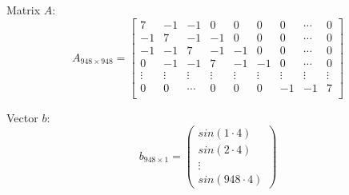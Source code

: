 \documentclass{article}
\begin{document}
Matrix $A$:
\[
A_{948 \times 948} = \begin{bmatrix}
    7 & -1 & -1 & 0 & 0 & 0 & 0 & \cdots & 0 \\
    -1 & 7 & -1 & -1 & 0 & 0 & 0 & \cdots & 0 \\
    -1 & -1 & 7 & -1 & -1 & 0 & 0 & \cdots & 0 \\
    0 & -1 & -1 & 7 & -1 & -1 & 0 & \cdots & 0 \\
    \vdots & \vdots & \vdots & \vdots & \vdots & \vdots & \vdots & \vdots & \vdots \\
    0 & 0 & \cdots & 0 & 0 & 0 & -1 & -1 & 7 \\

\end{bmatrix}
\]

Vector $b$:
\[
b_{948 \times 1} = \begin{pmatrix}
    sin(1 \cdot 4) \\
    sin(2 \cdot 4) \\
    \vdots \\
    sin(948 \cdot 4)
\end{pmatrix}
\]
\end{document}
